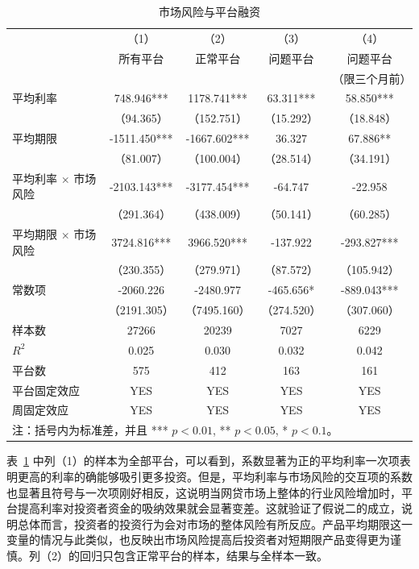 \documentclass[lang=cn,11pt]{elegantpaper}
\begin{document}
\begin{table}[htbp]
\centering
\caption{市场风险与平台融资\label{tab:mkt_risk}}
\begin{tabular}{lcccc}
\toprule
      & （1）   & （2）   & （3）   & （4） \\
      & 所有平台  & 正常平台  & 问题平台  & 问题平台 \\
      &       &       &       & （限三个月前） \\
\midrule
平均利率  & 748.946*** & 1178.741*** & 63.311*** & 58.850*** \\
      & （94.365） & （152.751） & （15.292） & （18.848） \\
平均期限  & -1511.450*** & -1667.602*** & 36.327 & 67.886** \\
      & （81.007） & （100.004） & （28.514） & （34.191） \\
平均利率 $\times$ 市场风险 & -2103.143*** & -3177.454*** & -64.747 & -22.958 \\
      & （291.364） & （438.009） & （50.141） & （60.285） \\
平均期限 $\times$ 市场风险 & 3724.816*** & 3966.520*** & -137.922 & -293.827*** \\
      & （230.355） & （279.971） & （87.572） & （105.942） \\
常数项   & -2060.226 & -2480.977 & -465.656* & -889.043*** \\
      & （2191.305） & （7495.160） & （274.520） & （307.060） \\
样本数   & 27266 & 20239 & 7027  & 6229 \\
$R^2$    & 0.025 & 0.030 & 0.032 & 0.042 \\
平台数   & 575   & 412   & 163   & 161 \\
平台固定效应 & YES   & YES   & YES   & YES \\
周固定效应 & YES   & YES   & YES   & YES \\
\bottomrule
\multicolumn{5}{p{10cm}}{\scriptsize 注：括号内为标准差，并且 *** $p<0.01$, ** $p<0.05$, * $p<0.1$。}
\end{tabular}%
\end{table}%

表~\ref{tab:mkt_risk} 中列（1）的样本为全部平台，可以看到，系数显著为正的平均利率一次项表明更高的利率的确能够吸引更多投资。但是，平均利率与市场风险的交互项的系数也显著且符号与一次项刚好相反，这说明当网贷市场上整体的行业风险增加时，平台提高利率对投资者资金的吸纳效果就会显著变差。这就验证了假说二的成立，说明总体而言，投资者的投资行为会对市场的整体风险有所反应。产品平均期限这一变量的情况与此类似，也反映出市场风险提高后投资者对短期限产品变得更为谨慎。列（2）的回归只包含正常平台的样本，结果与全样本一致。
\end{document}

